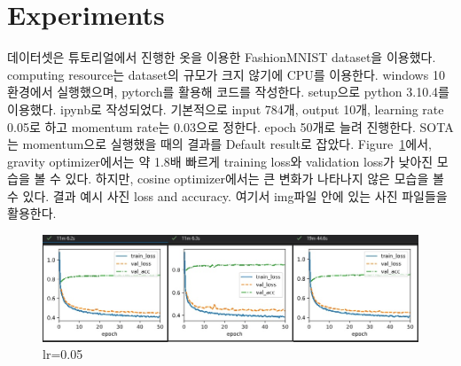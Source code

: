 \documentclass{article}
\begin{document}
\section{Experiments}
데이터셋은 튜토리얼에서 진행한 옷을 이용한 FashionMNIST dataset을 이용했다.
computing resource는 dataset의 규모가 크지 않기에 CPU를 이용한다. windows 10 환경에서 실행했으며, pytorch를 활용해 코드를 작성한다.
setup으로 python 3.10.4를 이용했다. ipynb로 작성되었다. 기본적으로 input 784개, output 10개, learning rate 0.05로 하고 momentum rate는 0.03으로 정한다. epoch 50개로 늘려 진행한다.
SOTA는 momentum으로 실행했을 때의 결과를 Default result로 잡았다. Figure~\ref{lr:0.05}에서, gravity optimizer에서는 약 1.8배 빠르게 training loss와 validation loss가 낮아진 모습을 볼 수 있다. 하지만, cosine optimizer에서는 큰 변화가 나타나지 않은 모습을 볼 수 있다.
결과 예시 사진 loss and accuracy. 여기서 img파일 안에 있는 사진 파일들을 활용한다.
\begin{figure}
   \includegraphics[width=\columnwidth]{img/lr0.05 m0.03.jpg}
   \caption{lr=0.05}
   \label{lr:0.05}
\end{figure}
\end{document}
